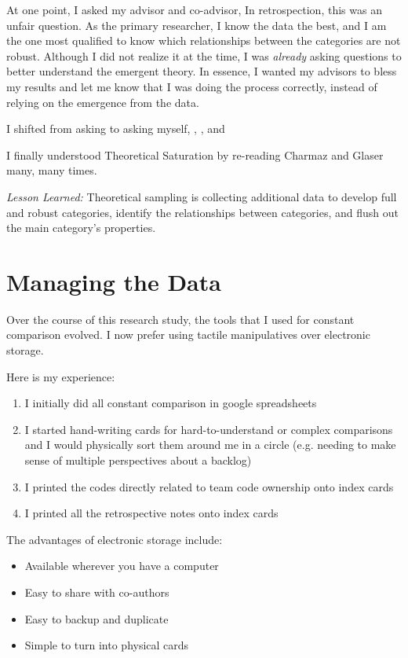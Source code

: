 At one point, I asked my advisor and co-advisor,  In retrospection, this was an unfair question. As the primary researcher, I know the data the best, and I am the one most qualified to know which relationships between the categories are not robust. Although I did not realize it at the time, I was \textit{already} asking questions to better understand the emergent theory. In essence, I wanted my advisors to bless my results and let me know that I was doing the process correctly, instead of relying on the emergence from the data.

I shifted from asking  to asking myself, , , and 

I finally understood Theoretical Saturation by re-reading Charmaz and Glaser many, many times. 

\textit{Lesson Learned:} Theoretical sampling is collecting additional data to develop full and robust categories, identify the relationships between categories, and flush out the main category's properties.

\section{Managing the Data}
Over the course of this research study, the tools that I used for constant comparison evolved. I now prefer using tactile manipulatives over electronic storage. 

Here is my experience:
\begin{enumerate}
  \item I initially did all constant comparison in google spreadsheets
  \item I started hand-writing cards for hard-to-understand or complex comparisons and I would physically sort them around me in a circle (e.g. needing to make sense of multiple perspectives about a backlog)
  \item I printed the codes directly related to team code ownership onto index cards
  \item I printed all the retrospective notes onto index cards
\end{enumerate}

The advantages of electronic storage include:
\begin{itemize}
  \item Available wherever you have a computer
  \item Easy to share with co-authors
  \item Easy to backup and duplicate
  \item Simple to turn into physical cards
\end{itemize}

